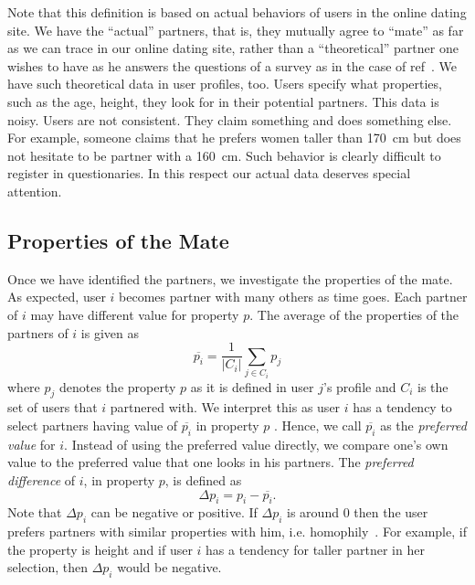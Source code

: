 \documentclass[journal,comsoc]{IEEEtran}
\newcommand{\hbAverage}[1]{\overline{#1}}
\newcommand{\hbIdea}[1]{{\color{red}{\scriptsize [{#1}]}}}
\newcommand{\refcite}[1]{ref~\cite{#1}}
\begin{document}
Note that  
this definition is based on actual behaviors of users in the online dating site.
We have the ``actual'' partners,
that is,
they mutually agree to ``mate'' 
as far as we can trace in our online dating site, 
rather than 
a ``theoretical'' partner one wishes to have 
as he answers the questions of a survey
as in the case of \refcite{
	Buss1989}.
We have such theoretical data in user profiles, too. 
Users specify what properties, 
such as the age, height, 
they look for in their potential partners.
This data is noisy.
Users are not consistent.
They claim something and does something else.
For example,
someone claims that he prefers women taller than 170~cm but
does not hesitate to be partner with a 160~cm.
Such behavior is clearly difficult to register in questionaries.
In this respect our actual data deserves special attention.

	




\subsection{Properties of the Mate}

\hbIdea{properties of the mate} %
Once we have identified the partners,
we investigate the properties of the mate.
As expected, 
user $i$ becomes partner with many others as time goes.
Each partner of $i$ may have different value for property $p$.
The average of the properties of the partners of $i$ 
is given as
\[
	\hbAverage{p_{i}} = \frac{1}{|C_{i}|}  \sum_{j \in C_{i}} p_{j}
\]
where 
$p_{j}$ denotes the property $p$ as it is defined in user $j$'s profile
and 
$C_{i}$ is the set of users that $i$ partnered with.
We interpret this as
user $i$ has a tendency to select partners having value of 
$\hbAverage{p_{i}}$ in property $p$ .
Hence, 
we call $\hbAverage{p_{i}}$ as the \emph{preferred value} for $i$.
%
Instead of using the preferred value directly,
we compare one's own value
to the preferred value that one looks in his partners.
The \emph{preferred difference} of $i$, 
in property $p$, 
is defined as
\[
	\Delta p_{i} = p_{i} - \hbAverage{p_{i}}.
\]
Note that $\Delta p_{i}$ can be negative or positive. 
If $\Delta p_{i}$ is around $0$
then the user prefers partners with similar properties with him, 
i.e. homophily~\cite{
	McPherson2001,
	Centola2011Science}.
For example, 
if the property is height
and
if user $i$ has a tendency for taller partner in her selection,
then $\Delta p_{i}$ would be negative.
\end{document}
